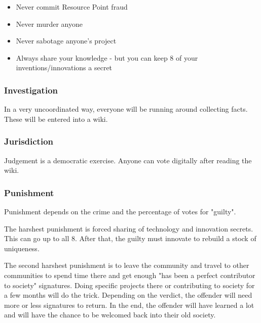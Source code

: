 \begin{itemize}
\item{Never commit Resource Point fraud}
\item{Never murder anyone}
\item{Never sabotage anyone's project}
\item{Always share your knowledge - but you can keep 8 of your inventions/innovations a secret}   %
\end{itemize}

\subsubsection{Investigation}

In a very uncoordinated way, everyone will be running around collecting facts. These will be entered into a wiki.

\subsubsection{Jurisdiction}

Judgement is a democratic exercise. Anyone can vote digitally after reading the wiki.

\subsubsection{Punishment}

Punishment depends on the crime and the percentage of votes for "guilty".

The harshest punishment is forced sharing of technology and innovation secrets. This can go up to all 8. After that, the guilty must innovate to rebuild a stock of uniqueness.

The second harshest punishment is to leave the community and travel to other communities to spend time there and get enough "has been a perfect contributor to society" signatures. Doing specific projects there or contributing to society for a few months will do the trick. Depending on the verdict, the offender will need more or less signatures to return. In the end, the offender will have learned a lot and will have the chance to be welcomed back into their old society.

